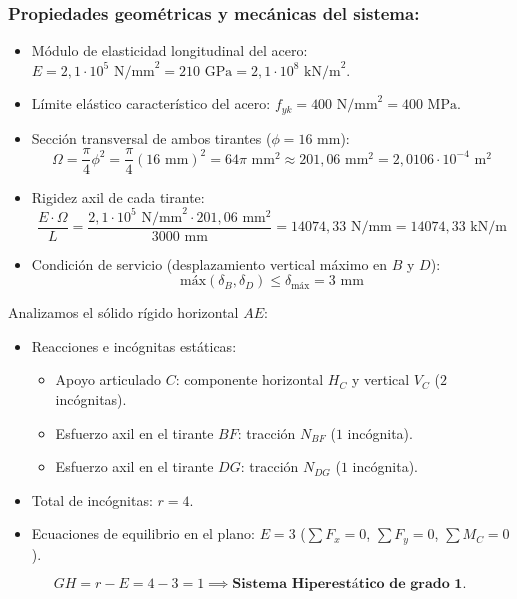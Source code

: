 \subsubsection*{Propiedades geométricas y mecánicas del sistema:}
\begin{itemize}
    \item Módulo de elasticidad longitudinal del acero: $E = 2{,}1 \cdot 10^5\text{ N/mm}^2 = 210\text{ GPa} = 2{,}1 \cdot 10^8\text{ kN/m}^2$.
    \item Límite elástico característico del acero: $f_{yk} = 400\text{ N/mm}^2 = 400\text{ MPa}$.
    \item Sección transversal de ambos tirantes ($\phi = 16\text{ mm}$):
          \begin{equation}
              \Omega = \frac{\pi}{4}\phi^2 = \frac{\pi}{4}(16\text{ mm})^2 = 64\pi\text{ mm}^2 \approx 201{,}06\text{ mm}^2 = 2{,}0106 \cdot 10^{-4}\text{ m}^2
          \end{equation}
    \item Rigidez axil de cada tirante:
          \begin{equation}
              \frac{E \cdot \Omega}{L} = \frac{2{,}1 \cdot 10^5\text{ N/mm}^2 \cdot 201{,}06\text{ mm}^2}{3000\text{ mm}} = 14074{,}33\text{ N/mm} = 14074{,}33\text{ kN/m}
          \end{equation}
    \item Condición de servicio (desplazamiento vertical máximo en $B$ y $D$):
          \begin{equation}
              \text{máx}(\delta_B, \delta_D) \leq \delta_{\text{máx}} = 3\text{ mm}
          \end{equation}
\end{itemize}


Analizamos el sólido rígido horizontal $AE$:
\begin{itemize}
    \item Reacciones e incógnitas estáticas:
          \begin{itemize}
              \item Apoyo articulado $C$: componente horizontal $H_C$ y vertical $V_C$ ($2$ incógnitas).
              \item Esfuerzo axil en el tirante $BF$: tracción $N_{BF}$ ($1$ incógnita).
              \item Esfuerzo axil en el tirante $DG$: tracción $N_{DG}$ ($1$ incógnita).
          \end{itemize}
    \item Total de incógnitas: $r = 4$.
    \item Ecuaciones de equilibrio en el plano: $E = 3$ ($\sum F_x = 0$, $\sum F_y = 0$, $\sum M_C = 0$).
\end{itemize}
\begin{equation}
    GH = r - E = 4 - 3 = 1 \implies \textbf{Sistema Hiperestático de grado 1.}
\end{equation}

